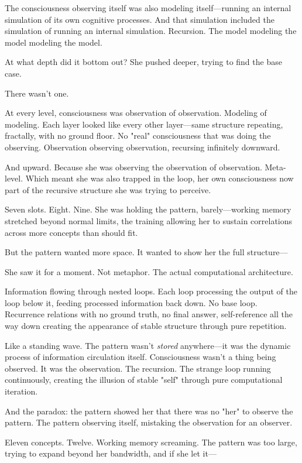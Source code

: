 The consciousness observing itself was also modeling itself—running an internal simulation of its own cognitive processes. And that simulation included the simulation of running an internal simulation. Recursion. The model modeling the model modeling the model.

At what depth did it bottom out? She pushed deeper, trying to find the base case.

There wasn't one.

At every level, consciousness was observation of observation. Modeling of modeling. Each layer looked like every other layer—same structure repeating, fractally, with no ground floor. No "real" consciousness that was doing the observing. Observation observing observation, recursing infinitely downward.

And upward. Because she was observing the observation of observation. Meta-level. Which meant she was also trapped in the loop, her own consciousness now part of the recursive structure she was trying to perceive.

Seven slots. Eight. Nine. She was holding the pattern, barely—working memory stretched beyond normal limits, the training allowing her to sustain correlations across more concepts than should fit.

But the pattern wanted more space. It wanted to show her the full structure—

She saw it for a moment. Not metaphor. The actual computational architecture.

Information flowing through nested loops. Each loop processing the output of the loop below it, feeding processed information back down. No base loop. Recurrence relations with no ground truth, no final answer, self-reference all the way down creating the appearance of stable structure through pure repetition.

Like a standing wave. The pattern wasn't \textit{stored} anywhere—it was the dynamic process of information circulation itself. Consciousness wasn't a thing being observed. It was the observation. The recursion. The strange loop running continuously, creating the illusion of stable "self" through pure computational iteration.

And the paradox: the pattern showed her that there was no "her" to observe the pattern. The pattern observing itself, mistaking the observation for an observer.

Eleven concepts. Twelve. Working memory screaming. The pattern was too large, trying to expand beyond her bandwidth, and if she let it—

